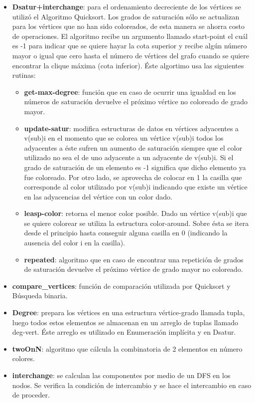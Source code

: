 \documentclass[a4paper,10pt]{article}
\begin{document}
\begin{itemize}
 \item \textbf{Dsatur+interchange}: para el ordenamiento decreciente de
       los vértices se utilizó el Algoritmo Quicksort. Los grados de
       saturación sólo se actualizan para los vértices que no han sido
       coloreados, de esta manera se ahorra costo de operaciones. El
       algoritmo recibe un argumento llamado start-point el cuál es -1
       para indicar que se quiere hayar la cota superior y recibe algún
       número mayor o igual que cero hasta el número de vértices del
       grafo cuando se quiere encontrar la clique máxima (cota
       inferior). \'Este algortimo usa las siguientes rutinas:
\begin{itemize}
 \item \textbf{get-max-degree}: función que en caso de ocurrir una
       igualdad en los números de saturación devuelve el próximo vértice
       no coloreado de grado mayor.
 \item \textbf{update-satur}: modifica estructuras de datos en vértices
       adyacentes a v(sub)i en el momento que se colorea un vértice
       v(sub)i todos los adyacentes a éste sufren un aumento de
       saturación siempre que el color utilizado no sea el de uno
       adyacente a un adyacente de v(sub)i. Si el grado de saturación de
       un elemento es -1 significa que dicho elemento ya fue
       coloreado. Por otro lado, se aprovecha de colocar en 1 la casilla
       que corresponde al color utilizado por v(sub)i indicando que 
       existe un vértice en las adyacencias del vértice con un color
       dado.
 \item \textbf{leasp-color}: retorna el menor color posible. Dado un
       vértice v(sub)i que se quiere colorear se utiliza la estructura
       color-around. Sobre ésta se itera desde el principio hasta
       conseguir alguna casilla en 0 (indicando la ausencia del color i
       en la casilla).
 \item \textbf{repeated}: algoritmo que en caso de encontrar una
       repetición de grados de saturación devuelve el próximo vértice de
       grado mayor no coloreado.
\end{itemize}
 \item \textbf{compare_vertices}: función de comparación utilizada por
       Quicksort y B\'usqueda binaria.
 \item \textbf{Degree}: prepara los vértices en una estructura
       vértice-grado llamada tupla, luego todos estos elementos se
       almacenan en un arreglo de tuplas llamado deg-vert. \'Este
       arreglo es utilizado en Enumeraci\'on impl\'icita y en Dsatur.
 \item \textbf{twoOnN}: algoritmo que cálcula la combinatoria de 2
       elementos en número colores.
 \item \textbf{interchange}: se calculan las componentes por medio de un
       DFS en los nodos. Se verifica la condición de intercambio y se
       hace el intercambio en caso de proceder.
\end{itemize}
\end{document}
